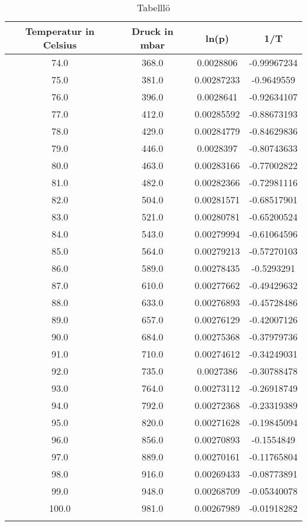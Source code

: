 \documentclass[
  captions=tableheading,
]{scrartcl}
\begin{document}
\begin{table}
  \caption{Tabelllö}
  \label{tab:Tabellö}
\begin{tabular}{c c c c}
Temperatur in Celsius& Druck in mbar&ln(p)&1/T\\

 \midrule



74.0    &    368.0    &    0.0028806    &    -0.99967234\\
75.0    &    381.0    &    0.00287233    &    -0.9649559\\
76.0    &    396.0    &    0.0028641    &    -0.92634107\\
77.0    &    412.0    &    0.00285592    &    -0.88673193\\
78.0    &    429.0    &    0.00284779    &    -0.84629836\\
79.0    &    446.0    &    0.0028397    &    -0.80743633\\
80.0    &    463.0    &    0.00283166    &    -0.77002822\\
81.0    &    482.0    &    0.00282366    &    -0.72981116\\
82.0    &    504.0    &    0.00281571    &    -0.68517901\\
83.0    &    521.0    &    0.00280781    &    -0.65200524\\
84.0    &    543.0    &    0.00279994    &    -0.61064596\\
85.0    &    564.0    &    0.00279213    &    -0.57270103\\
86.0    &    589.0    &    0.00278435    &    -0.5293291\\
87.0    &    610.0    &    0.00277662    &    -0.49429632\\
88.0    &    633.0    &    0.00276893    &    -0.45728486\\
89.0    &    657.0    &    0.00276129    &    -0.42007126\\
90.0    &    684.0    &    0.00275368    &    -0.37979736\\
91.0    &    710.0    &    0.00274612    &    -0.34249031\\
92.0    &    735.0    &    0.0027386    &    -0.30788478\\
93.0    &    764.0    &    0.00273112    &    -0.26918749\\
94.0    &    792.0    &    0.00272368    &    -0.23319389\\
95.0    &    820.0    &    0.00271628    &    -0.19845094\\
96.0    &    856.0    &    0.00270893    &    -0.1554849\\
97.0    &    889.0    &    0.00270161    &    -0.11765804\\
98.0    &    916.0    &    0.00269433    &    -0.08773891\\
99.0    &    948.0    &    0.00268709    &    -0.05340078\\
100.0    &    981.0    &    0.00267989    &    -0.01918282\\}
\end{tabular}
\end{table}
\end{document}
